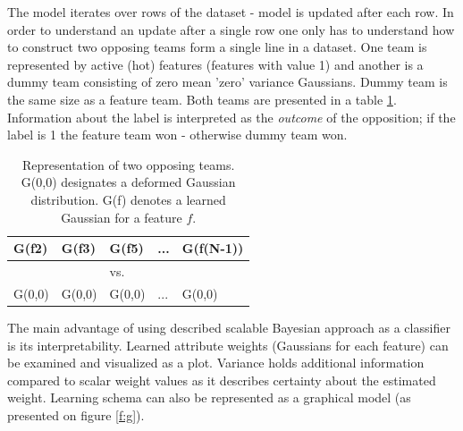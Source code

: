 \documentclass{article}
\begin{document}
\bigbreak
The model iterates over rows of the dataset - model is updated after each row. In order to understand an update after a single row one only has to understand how to construct two opposing teams form a single line in a dataset. One team is represented by active (hot) features (features with value 1) and another is a dummy team consisting of zero mean 'zero'  variance Gaussians. Dummy team is the same size as a feature team. Both teams are presented in a table \ref{tab:teams}. Information about the label is interpreted as the \emph{outcome} of the opposition; if the label is 1 the feature team won - otherwise dummy team won.


\begin{table}[h!]
\caption{Representation of two opposing teams. G(0,0) designates a deformed Gaussian distribution. G(f) denotes a learned Gaussian for a feature $f$.}
\centering
\begin{tabular}{lllll}
\hline
\multicolumn{1}{|l|}{G(f2)}  & \multicolumn{1}{l|}{G(f3)}  & \multicolumn{1}{l|}{G(f5)}  & \multicolumn{1}{l|}{...} & \multicolumn{1}{l|}{G(f(N-1))} \\ \hline
                             &                             & vs.                         &                          &                                \\ \hline
\multicolumn{1}{|l|}{G(0,0)} & \multicolumn{1}{l|}{G(0,0)} & \multicolumn{1}{l|}{G(0,0)} & \multicolumn{1}{l|}{...} & \multicolumn{1}{l|}{G(0,0)}    \\ \hline
\end{tabular}
\label{tab:teams}
\end{table}


\bigbreak
The main advantage of using described scalable Bayesian approach as a classifier is its interpretability.  Learned attribute weights (Gaussians for each feature) can be examined and visualized as a plot. Variance holds additional information compared to scalar weight values as it describes certainty about the estimated weight. Learning schema can also be represented as a graphical model (as presented on figure \ref{f:g}).
\end{document}
